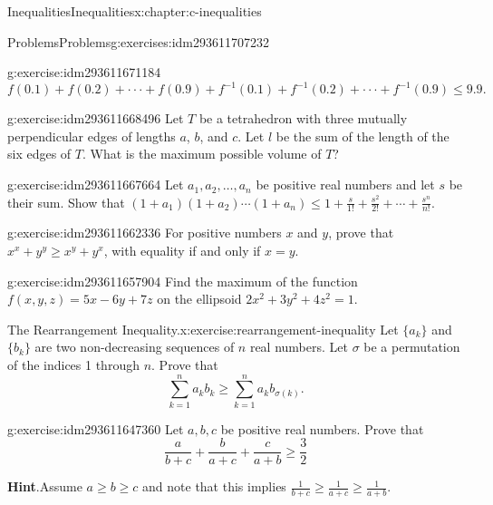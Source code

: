 \documentclass[twoside,10pt,]{book}
\newcommand{\blocktitlefont}{\relax}
\numberwithin{equation}{section}
\begin{document}
\begin{chapterptx}{Inequalities}{}{Inequalities}{}{}{x:chapter:c-inequalities}
\begin{exercises-section}{Problems}{}{Problems}{}{}{g:exercises:idm293611707232}
\begin{divisionexercise}{8}{}{}{g:exercise:idm293611671184}
\begin{equation*}
f(0.1)+f(0.2)+\cdot  \cdot  \cdot +f(0.9)+f^{-1}(0.1)+f^{-1}(0.2)+\cdot  \cdot  \cdot +f^{-1}(0.9) \leq  9.9\text{.}
\end{equation*}
%
\end{divisionexercise}%
\begin{divisionexercise}{9}{}{}{g:exercise:idm293611668496}%
Let \(T\) be a tetrahedron with three mutually perpendicular edges of lengths \(a\), \(b\), and \(c\).  Let \(l\) be the sum of the length of the six edges of \(T\).  What is the maximum possible volume of \(T\)?%
\end{divisionexercise}%
\begin{divisionexercise}{10}{}{}{g:exercise:idm293611667664}%
Let \(a_1, a_2, \ldots  , a_n\) be positive real numbers and let \(s\) be their sum.  Show that \(\left(1+a_1\right)\left(1+a_2\right)\cdots \left(1+a_n\right) \leq  1 + \frac{s}{1!}+ \frac{s^2}{2!}+ \cdots +\frac{s^n}{n!}\).%
\end{divisionexercise}%
\begin{divisionexercise}{11}{}{}{g:exercise:idm293611662336}%
For positive numbers \(x\) and \(y\), prove that \(x^x+y^y\geq x^y+ y^x\), with equality if and only if \(x=y\).%
\end{divisionexercise}%
\begin{divisionexercise}{12}{}{}{g:exercise:idm293611657904}%
Find the maximum of the function \(f(x,y,z)=5x -6y+7z\) on the ellipsoid \(2x^2+3y^2+4z^2=1\).%
\end{divisionexercise}%
\begin{divisionexercise}{13}{The Rearrangement Inequality.}{}{x:exercise:rearrangement-inequality}%
%
Let \(\{a_k\}\) and \(\{b_k\}\) are two non-decreasing sequences of \(n\) real numbers.  Let \(\sigma\) be a permutation of the indices 1 through \(n\).  Prove that%
\begin{equation*}
\sum_{k=1}^n a_k b_k \ge \sum_{k=1}^n a_k b_{\sigma(k)}.
\end{equation*}
%
\end{divisionexercise}%
\begin{divisionexercise}{14}{}{}{g:exercise:idm293611647360}%
Let \(a, b, c\) be positive real numbers.  Prove that%
\begin{equation*}
\frac{a}{b+c} + \frac{b}{a+c}+ \frac{c}{a+b} \ge \frac{3}{2}
\end{equation*}
%
\par\smallskip%
\noindent\textbf{\blocktitlefont Hint}.\label{g:hint:idm293611645408}{}\hypertarget{g:hint:idm293611645408}{}\quad{}Assume \(a \ge b \ge c\) and note that this implies \(\frac{1}{b+c} \ge \frac{1}{a+c} \ge \frac{1}{a+b}\).%
\end{divisionexercise}%
\end{exercises-section}
\end{chapterptx}
\end{document}
